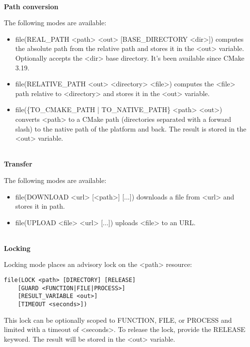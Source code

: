 \hspace*{\fill} \\ %
\noindent
\textbf{Path conversion}

The following modes are available:

\begin{itemize}
\item 
file(REAL\_PATH <path> <out> [BASE\_DIRECTORY <dir>]) computes the absolute path from the relative path and stores it in the <out> variable. Optionally accepts the <dir> base directory. It's been available since CMake 3.19.

\item 
file(RELATIVE\_PATH <out> <directory> <file>) computes the <file> path relative to <directory> and stores it in the <out> variable.

\item 
file(\{TO\_CMAKE\_PATH | TO\_NATIVE\_PATH\} <path> <out>) converts <path> to a CMake path (directories separated with a forward slash) to the native path of the platform and back. The result is stored in the <out> variable.
\end{itemize}

\hspace*{\fill} \\ %
\noindent
\textbf{Transfer}

The following modes are available:

\begin{itemize}
\item 
file(DOWNLOAD <url> [<path>] [...]) downloads a file from <url> and stores it in path.

\item 
file(UPLOAD <file> <url> [...]) uploads <file> to an URL.
\end{itemize}


\hspace*{\fill} \\ %
\noindent
\textbf{Locking}

Locking mode places an advisory lock on the <path> resource:

\begin{lstlisting}[style=styleCMake]
file(LOCK <path> [DIRECTORY] [RELEASE]
	[GUARD <FUNCTION|FILE|PROCESS>]
	[RESULT_VARIABLE <out>]
	[TIMEOUT <seconds>])
\end{lstlisting}

This lock can be optionally scoped to FUNCTION, FILE, or PROCESS and limited with a timeout of <seconds>. To release the lock, provide the RELEASE keyword. The result will be stored in the <out> variable.

